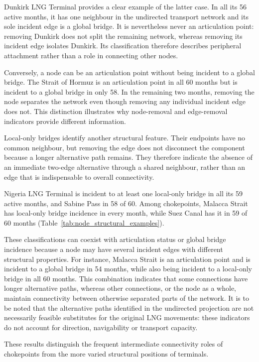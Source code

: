 \documentclass[pdftex,12pt,openright,a4paper,oneside]{book}
\begin{document}
Dunkirk LNG Terminal provides a clear example of the latter case. In all its 56 active months, it has one neighbour in the undirected transport network and its sole incident edge is a global bridge. It is nevertheless never an articulation point: removing Dunkirk does not split the remaining network, whereas removing its incident edge isolates Dunkirk. Its classification therefore describes peripheral attachment rather than a role in connecting other nodes.

Conversely, a node can be an articulation point without being incident to a global bridge. The Strait of Hormuz is an articulation point in all 60 months but is incident to a global bridge in only 58. In the remaining two months, removing the node separates the network even though removing any individual incident edge does not. This distinction illustrates why node-removal and edge-removal indicators provide different information.

Local-only bridges identify another structural feature. Their endpoints have no common neighbour, but removing the edge does not disconnect the component because a longer alternative path remains. They therefore indicate the absence of an immediate two-edge alternative through a shared neighbour, rather than an edge that is indispensable to overall connectivity.

Nigeria LNG Terminal is incident to at least one local-only bridge in all its 59 active months, and Sabine Pass in 58 of 60. Among chokepoints, Malacca Strait has local-only bridge incidence in every month, while Suez Canal has it in 59 of 60 months (Table~\ref{tab:node_structural_examples}). 

These classifications can coexist with articulation status or global bridge incidence because a node may have several incident edges with different structural properties.
For instance, Malacca Strait is an articulation point and is incident to a global bridge in 54 months, while also being incident to a local-only bridge in all 60 months. 
This combination indicates that some connections have longer alternative paths, whereas other connections, or the node as a whole, maintain connectivity between otherwise separated parts of the network. 
It is to be noted that the alternative paths identified in the undirected projection are not necessarily feasible substitutes for the original LNG movements: these indicators do not account for direction, navigability or transport capacity.

These results distinguish the frequent intermediate connectivity roles of chokepoints from the more varied structural positions of terminals. 
\end{document}
